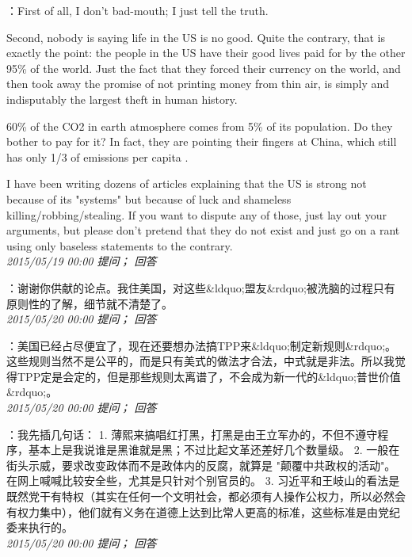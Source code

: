 \documentclass[twocolumn]{ctexart}
\begin{document}
：First of all, I don't bad-mouth; I just tell the truth.

Second, nobody is saying life in the US is no good. Quite the contrary, that is exactly the point: the people in the US have their good lives paid for by the other 95\% of the world. Just the fact that they forced their currency on the world, and then took away the promise of not printing money from thin air, is simply and indisputably the largest theft in human history. 

60\% of the CO2 in earth atmosphere comes from 5\% of its population. Do they bother to pay for it? In fact, they are pointing their fingers at China, which still has only 1/3 of emissions per capita .

I have been writing dozens of articles explaining that the US is strong not because of its "systems" but because of luck and shameless killing/robbing/stealing. If you want to dispute any of those, just lay out your arguments, but please don't pretend that they do not exist and just go on a rant using only baseless statements to the contrary.\\

\textit{\hfill\noindent\small 2015/05/19 00:00 提问； 回答}

：谢谢你供献的论点。我住美国，对这些\&ldquo;盟友\&rdquo;被洗脑的过程只有原则性的了解，细节就不清楚了。\\

\textit{\hfill\noindent\small 2015/05/20 00:00 提问； 回答}

：美国已经占尽便宜了，现在还要想办法搞TPP来\&ldquo;制定新规则\&rdquo;。这些规则当然不是公平的，而是只有美式的做法才合法，中式就是非法。所以我觉得TPP定是会定的，但是那些规则太离谱了，不会成为新一代的\&ldquo;普世价值\&rdquo;。\\

\textit{\hfill\noindent\small 2015/05/20 00:00 提问； 回答}

：我先插几句话：
1. 薄熙来搞唱红打黑，打黑是由王立军办的，不但不遵守程序，基本上是我说谁是黑谁就是黑；不过比起文革还差好几个数量级。
2. 一般在街头示威，要求改变政体而不是政体内的反腐，就算是 "颠覆中共政权的活动"。在网上喊喊比较安全些，尤其是只针对个别官员的。
3. 习近平和王岐山的看法是既然党干有特权（其实在任何一个文明社会，都必须有人操作公权力，所以必然会有权力集中），他们就有义务在道德上达到比常人更高的标准，这些标准是由党纪委来执行的。\\

\textit{\hfill\noindent\small 2015/05/20 00:00 提问； 回答}
\end{document}
